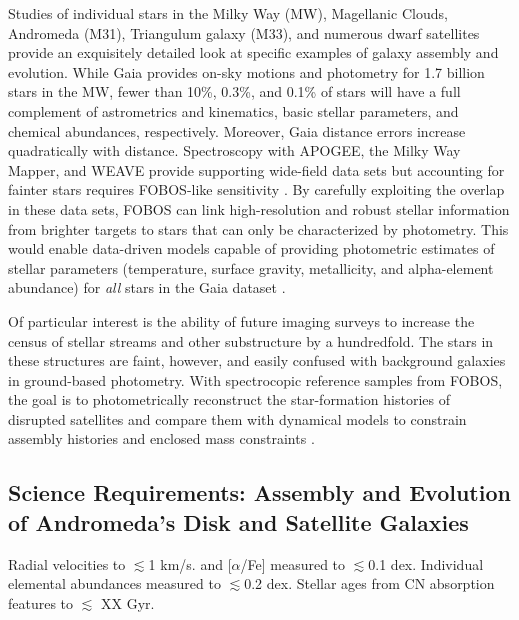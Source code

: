 \documentclass[11pt,a4paper,twoside,onecolumn,openany,final,oldfontcommands]{memoir}
\begin{document}
Studies of individual stars in the Milky Way (MW), Magellanic Clouds, Andromeda (M31), Triangulum galaxy (M33), and numerous dwarf satellites provide an exquisitely detailed look at specific examples of galaxy assembly and evolution. While Gaia provides on-sky motions and photometry for 1.7 billion stars in the MW, fewer than 10\%, 0.3\%, and 0.1\% of stars will have a full complement of astrometrics and kinematics, basic stellar parameters, and chemical abundances, respectively.  Moreover, Gaia distance errors increase quadratically with distance.  Spectroscopy with APOGEE, the Milky Way Mapper, and WEAVE provide supporting wide-field data sets but accounting for fainter stars requires FOBOS-like sensitivity \citep[see][]{dey19,sanderson19}.  By carefully exploiting the overlap in these data sets, FOBOS can link high-resolution and robust stellar information from brighter targets to stars that can only be characterized by photometry.  This would enable data-driven models capable of providing photometric estimates of stellar parameters (temperature, surface gravity, metallicity, and alpha-element abundance) for {\it all} stars in the Gaia dataset  \citep[see][]{2015ApJ...808...16N, 2018arXiv180401530T, 2018arXiv180803278T}. 

Of particular interest is the ability of future imaging surveys to increase the census of stellar streams and other substructure by a hundredfold.  The stars in these structures are faint, however, and easily confused with background galaxies in ground-based photometry.  With spectrocopic reference samples from FOBOS, the goal is to photometrically reconstruct the star-formation histories of disrupted satellites and compare them with dynamical models to constrain assembly histories and enclosed mass constraints \citep[e.g.,][]{2017ApJ...836..234S}.

\subsection{Science Requirements: Assembly and Evolution of Andromeda's Disk and Satellite Galaxies}

\begin{sciencerequirement}

\reqitem Radial velocities to $\lesssim$1 km/s.
\reqitem [Fe/H] and [$\alpha$/Fe] measured to $\lesssim$0.1 dex.
\reqitem Individual elemental abundances measured to $\lesssim$0.2 dex.
\reqitem Stellar ages from CN absorption features to $\lesssim$ XX Gyr.

\end{sciencerequirement}
\end{document}

